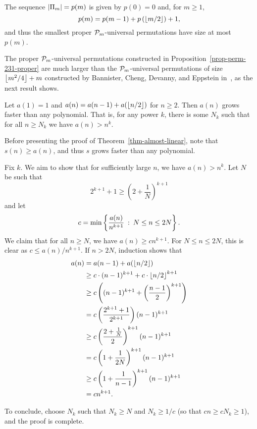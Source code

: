 \begin{corollary}
\label{cor-231-ub-formula}
The sequence $\size{\Pi_{m}} = p(m)$ is given by $p(0) = 0$ and, for $m \ge 1$,
\[
	p(m) 
	= 
	p(m-1) + p\left(\floor{m/2}\right) + 1,
\]
and thus the smallest proper $\P_m$-universal permutations have size at most $p(m)$.
\end{corollary}

The proper $\P_m$-universal permutations constructed in Proposition~\ref{prop-perm-231-proper} are much larger than the $\P_m$-universal permutations of size $\floor{m^2/4} + m$ constructed by Bannister, Cheng, Devanny, and Eppstein in~\cite{bannister:superpatterns-a:}, as the next result shows.

\begin{theorem}
\label{thm-almost-linear}
Let $a(1) = 1$ and $a(n) = a(n-1) + a(\floor{n/2})$ for $n \ge 2$. Then $a(n)$ grows faster than any polynomial. That is, for any power $k$, there is some $N_k$ such that for all $n \ge N_k$ we have $a(n) > n^k$.
\end{theorem}

Before presenting the proof of Theorem~\ref{thm-almost-linear}, note that $s(n) \ge a(n)$, and thus $s$ grows faster than any polynomial.

\newenvironment{proof-of-thm-almost-linear}{%
	\medskip\noindent {\it Proof of Proposition~\ref{thm-almost-linear}.\/}%
}{%
	\qed\bigskip%
}
\begin{proof-of-thm-almost-linear}
	Fix $k$. We aim to show that for sufficiently large $n$, we have $a(n) > n^k$. Let $N$ be such that 
	\[
		2^{k+1} + 1 \ge \left(2 + \frac{1}{N}\right)^{k+1}
	\]
	and let
	\[
		c 
		=
		\min\left\{\frac{a(n)}{n^{k+1}} \st N \le n \le 2N\right\}.
	\]
	We claim that for all $n \ge N$, we have $a(n) \ge cn^{k+1}$. For $N \le n \le 2N$, this is clear as $c \le a(n)/n^{k+1}$. If $n > 2N$, induction shows that
	\begin{align*}
		a(n)
			&= a(n-1) + a(\floor{n/2}) \\
			&\ge c\cdot(n-1)^{k+1} + c\cdot\floor{n/2}^{k+1} \\
			&\ge c\left((n-1)^{k+1} + \left(\frac{n-1}{2}\right)^{k+1}\right) \\
			&=   c\left( \frac{2^{k+1}+1}{2^{k+1}} \right)     (n-1)^{k+1} \\
			&\ge c\left( \frac{2+\frac{1}{N}}{2} \right)^{k+1} (n-1)^{k+1} \\
			&=   c\left( 1+\frac{1}{2N}          \right)^{k+1} (n-1)^{k+1} \\
			&\ge c\left( 1+\frac{1}{n-1}         \right)^{k+1} (n-1)^{k+1} \\
			&=   c n^{k+1}.
	\end{align*}
	
	To conclude, choose $N_k$ such that $N_k \ge N$ and $N_k \ge 1/c$ (so that $cn \ge c N_k \ge 1$), and the proof is complete.
\end{proof-of-thm-almost-linear}

